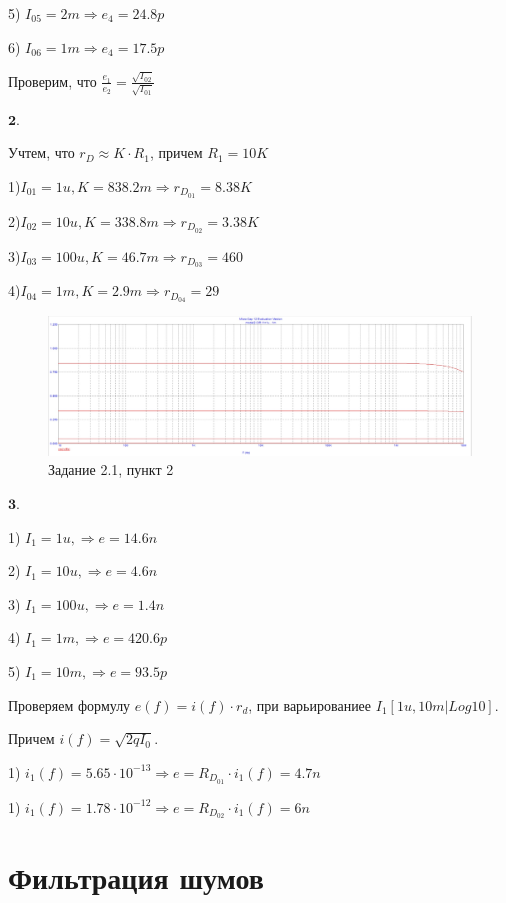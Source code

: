 \documentclass[a4paper, 14pt]{extarticle}%
\begin{document}
5) $I_{05} = 2m \Rightarrow e_4 = 24.8p$

6) $I_{06} = 1m \Rightarrow e_4 = 17.5p$


Проверим, что $\frac{e_1}{e_2} = \frac{\sqrt{I_{02}}}{\sqrt{I_{01}}}$

$\textbf{2.}$

Учтем, что $r_D \approx K\cdot R_1$, причем $R_1 = 10K$

1)$I_{01} = 1u, K = 838.2m \Rightarrow r_{D_{01}} = 8.38K$

2)$I_{02} = 10u, K = 338.8m \Rightarrow r_{D_{02}} = 3.38K$

3)$I_{03} = 100u, K = 46.7m  \Rightarrow r_{D_{03}} = 460$

4)$I_{04} = 1m, K = 2.9m \Rightarrow r_{D_{04}} = 29$


\begin{figure}[h!]
			\centering
			\includegraphics[width=1.1\linewidth]{2.1/pic13.jpg}
			\caption{Задание 2.1, пункт 2}
			\label{A}
\end{figure}


$\textbf{3.}$

1) $I_1 = 1u, \Rightarrow e = 14.6n$

2) $I_1 = 10u, \Rightarrow e = 4.6n $

3) $I_1 = 100u , \Rightarrow  e = 1.4n $

4) $I_1 = 1m , \Rightarrow e = 420.6p$

5) $I_1 = 10m,  \Rightarrow e = 93.5p$

Проверяем формулу $e(f) = i(f)\cdot r_d$, при варьированиее $I_1[1u, 10m | Log10] $.

Причем $i(f) = \sqrt{2qI_0}$.

1) $i_1(f) = 5.65\cdot 10^{-13} \Rightarrow e = R_{D_{01}} \cdot i_1(f)  = 4.7n$

1) $i_1(f) = 1.78\cdot 10^{-12} \Rightarrow e = R_{D_{02}} \cdot i_1(f) = 6n$





\newpage

\section{Фильтрация шумов}
\end{document}
